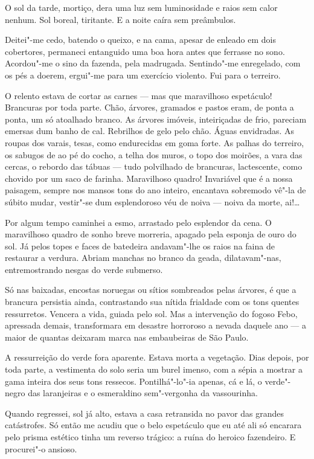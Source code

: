 O sol da tarde, mortiço, dera uma luz sem luminosidade e raios sem calor
nenhum. Sol boreal, tiritante. E a noite caíra sem preâmbulos.

Deitei"-me cedo, batendo o queixo, e na cama, apesar de enleado em dois
cobertores, permaneci entanguido uma boa hora antes que ferrasse no
sono. Acordou"-me o sino da fazenda, pela madrugada. Sentindo"-me
enregelado, com os pés a doerem, ergui"-me para um exercício violento.
Fui para o terreiro.

O relento estava de cortar as carnes --- mas que maravilhoso espetáculo!
Brancuras por toda parte. Chão, árvores, gramados e pastos eram, de
ponta a ponta, um só atoalhado branco. As árvores imóveis, inteiriçadas
de frio, pareciam emersas dum banho de cal. Rebrilhos de gelo pelo chão.
Águas envidradas. As roupas dos varais, tesas, como endurecidas em goma
forte. As palhas do terreiro, os sabugos de ao pé do cocho, a telha dos
muros, o topo dos moirões, a vara das cercas, o rebordo das tábuas ---
tudo polvilhado de brancuras, lactescente, como chovido por um saco de
farinha. Maravilhoso quadro! Invariável que é a nossa paisagem, sempre
nos mansos tons do ano inteiro, encantava sobremodo vê"-la de súbito
mudar, vestir"-se dum esplendoroso véu de noiva --- noiva da morte,
ai!\ldots{}

Por algum tempo caminhei a esmo, arrastado pelo esplendor da cena. O
maravilhoso quadro de sonho breve morreria, apagado pela esponja de ouro
do sol. Já pelos topes e faces de batedeira andavam"-lhe os raios na
faina de restaurar a verdura. Abriam manchas no branco da geada,
dilatavam"-nas, entremostrando nesgas do verde submerso.

Só nas baixadas, encostas noruegas ou sítios sombreados pelas árvores, é
que a brancura persistia ainda, contrastando sua nítida frialdade com os
tons quentes ressurretos. Vencera a vida, guiada pelo sol. Mas a
intervenção do fogoso Febo, apressada demais, transformara em desastre
horroroso a nevada daquele ano --- a maior de quantas deixaram marca nas
embaubeiras de São Paulo.

A ressurreição do verde fora aparente. Estava morta a vegetação. Dias
depois, por toda parte, a vestimenta do solo seria um burel imenso, com
a sépia a mostrar a gama inteira dos seus tons ressecos. Pontilhá"-lo"-ia
apenas, cá e lá, o verde"-negro das laranjeiras e o esmeraldino
sem"-vergonha da vassourinha.

Quando regressei, sol já alto, estava a casa retransida no pavor das
grandes catástrofes. Só então me acudiu que o belo espetáculo que eu até
ali só encarara pelo prisma estético tinha um reverso trágico: a ruína
do heroico fazendeiro. E procurei"-o ansioso.

